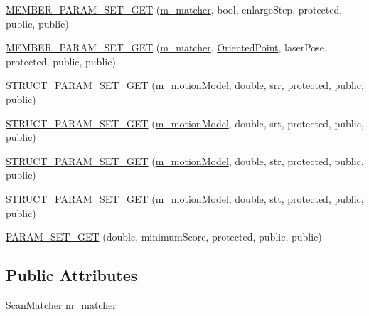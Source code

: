 \begin{DoxyCompactItemize}
\item 
\hyperlink{classGMapping_1_1GridSlamProcessor_ad7e50913d07e1003d2fb97b40b3768aa}{M\+E\+M\+B\+E\+R\+\_\+\+P\+A\+R\+A\+M\+\_\+\+S\+E\+T\+\_\+\+G\+ET} (\hyperlink{classGMapping_1_1GridSlamProcessor_ac50952d259590c4aeba22eee4e6437f5}{m\+\_\+matcher}, bool, enlarge\+Step, protected, public, public)
\item 
\hyperlink{classGMapping_1_1GridSlamProcessor_a02a3a4462d3e5f35e746a789f0d9674c}{M\+E\+M\+B\+E\+R\+\_\+\+P\+A\+R\+A\+M\+\_\+\+S\+E\+T\+\_\+\+G\+ET} (\hyperlink{classGMapping_1_1GridSlamProcessor_ac50952d259590c4aeba22eee4e6437f5}{m\+\_\+matcher}, \hyperlink{structGMapping_1_1orientedpoint}{Oriented\+Point}, laser\+Pose, protected, public, public)
\item 
\hyperlink{classGMapping_1_1GridSlamProcessor_a5dca255f4b499a703a002715fd70828e}{S\+T\+R\+U\+C\+T\+\_\+\+P\+A\+R\+A\+M\+\_\+\+S\+E\+T\+\_\+\+G\+ET} (\hyperlink{classGMapping_1_1GridSlamProcessor_ae1fa20e9679abdbc23784e2dc17194b5}{m\+\_\+motion\+Model}, double, srr, protected, public, public)
\item 
\hyperlink{classGMapping_1_1GridSlamProcessor_a10f9bff87947ec28aedae11a3ec97f3d}{S\+T\+R\+U\+C\+T\+\_\+\+P\+A\+R\+A\+M\+\_\+\+S\+E\+T\+\_\+\+G\+ET} (\hyperlink{classGMapping_1_1GridSlamProcessor_ae1fa20e9679abdbc23784e2dc17194b5}{m\+\_\+motion\+Model}, double, srt, protected, public, public)
\item 
\hyperlink{classGMapping_1_1GridSlamProcessor_a8cb558f4aa4f6f57f2173a0ac8f63bc1}{S\+T\+R\+U\+C\+T\+\_\+\+P\+A\+R\+A\+M\+\_\+\+S\+E\+T\+\_\+\+G\+ET} (\hyperlink{classGMapping_1_1GridSlamProcessor_ae1fa20e9679abdbc23784e2dc17194b5}{m\+\_\+motion\+Model}, double, str, protected, public, public)
\item 
\hyperlink{classGMapping_1_1GridSlamProcessor_a272f53828c2033879c364de540d1e0c0}{S\+T\+R\+U\+C\+T\+\_\+\+P\+A\+R\+A\+M\+\_\+\+S\+E\+T\+\_\+\+G\+ET} (\hyperlink{classGMapping_1_1GridSlamProcessor_ae1fa20e9679abdbc23784e2dc17194b5}{m\+\_\+motion\+Model}, double, stt, protected, public, public)
\item 
\hyperlink{classGMapping_1_1GridSlamProcessor_aef1af48fa8542ceff98b81e1d0f6e039}{P\+A\+R\+A\+M\+\_\+\+S\+E\+T\+\_\+\+G\+ET} (double, minimum\+Score, protected, public, public)
\end{DoxyCompactItemize}
\subsection*{Public Attributes}
\begin{DoxyCompactItemize}
\item 
\hyperlink{classGMapping_1_1ScanMatcher}{Scan\+Matcher} \hyperlink{classGMapping_1_1GridSlamProcessor_ac50952d259590c4aeba22eee4e6437f5}{m\+\_\+matcher}
\end{DoxyCompactItemize}
